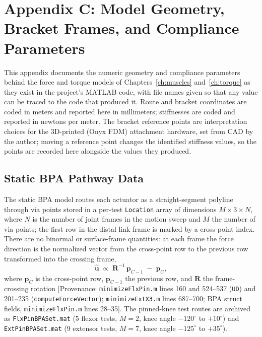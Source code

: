 \chapter{Appendix C: Model Geometry, Bracket Frames, and Compliance Parameters}\label{app:model_geometry}
\graphicspath{{../Figures/94-AppendixC/}{figs/94-AppendixC/}{../Figures/30-torque/}}

This appendix documents the numeric geometry and compliance parameters behind the force and torque models of Chapters~\ref{ch:muscles} and~\ref{ch:torque} as they exist in the project's MATLAB code, with file names given so that any value can be traced to the code that produced it. Route and bracket coordinates are coded in meters and reported here in millimeters; stiffnesses are coded and reported in newtons per meter. The bracket reference points are interpretation choices for the 3D-printed (Onyx FDM) attachment hardware, set from CAD by the author; moving a reference point changes the identified stiffness values, so the points are recorded here alongside the values they produced.

\section{Static BPA Pathway Data}

The static BPA model routes each actuator as a straight-segment polyline through via points stored in a per-test \texttt{Location} array of dimensions $M\times3\times N$, where $N$ is the number of joint frames in the motion sweep and $M$ the number of via points; the first row in the distal link frame is marked by a cross-point index. There are no binormal or surface-frame quantities: at each frame the force direction is the normalized vector from the cross-point row to the previous row transformed into the crossing frame,
\begin{equation}
    \hat{\mathbf{u}} \;\propto\; \mathbf{R}^{-1}\,\mathbf{p}_{C-1} \;-\; \mathbf{p}_{C},
    \label{eq:app_forcedir}
\end{equation}
where $\mathbf{p}_{C}$ is the cross-point row, $\mathbf{p}_{C-1}$ the previous row, and $\mathbf{R}$ the frame-crossing rotation [Provenance: \texttt{minimizeFlxPin.m} lines 160 and 524--537 (\texttt{UD}) and 201--235 (\texttt{computeForceVector}); \texttt{minimizeExtX3.m} lines 687--700; BPA struct fields, \texttt{minimizeFlxPin.m} lines 28--35]. The pinned-knee test routes are archived as \texttt{FlxPinBPASet.mat} (5 flexor tests, $M=2$, knee angle $-120^{\circ}$ to $+10^{\circ}$) and \texttt{ExtPinBPASet.mat} (9 extensor tests, $M=7$, knee angle $-125^{\circ}$ to $+35^{\circ}$).

